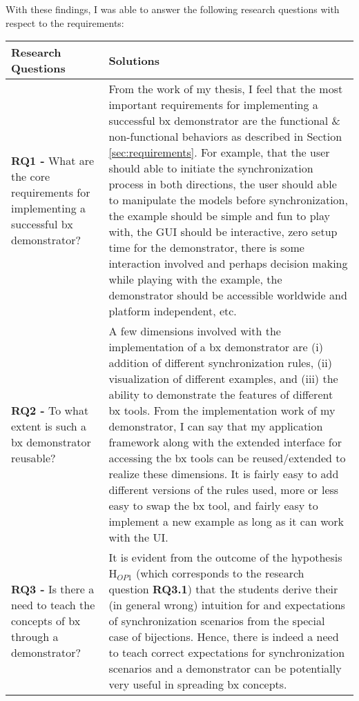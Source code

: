 With these findings, I was able to answer the following research questions with respect to the requirements:
\begin{table}[h]
	\begin{tabular}{|p{5cm}|p{9.5cm}|}
		\hline
		\rowcolor[gray]{.8}	
		\textbf{Research Questions} & \textbf{Solutions}\\
		\hline
		\textbf{RQ1 -} What are the core requirements for implementing a successful bx demonstrator? &
		From the work of my thesis, I feel that the most important requirements for implementing a successful bx demonstrator are the functional \& non-functional behaviors as described in Section \ref{sec:requirements}. For example, that the user should able to initiate the synchronization process in both directions, the user should able to manipulate the models before synchronization, the example should be simple and fun to play with, the GUI should be interactive, zero setup time for the demonstrator, there is some interaction involved and perhaps decision making while playing with the example, the demonstrator should be accessible worldwide and platform independent, etc. \\
		\hline
		\textbf{RQ2 -} To what extent is such a bx demonstrator reusable? &
		A few dimensions involved with the implementation of a bx demonstrator are (i) addition of different synchronization rules, (ii) visualization of different examples, and (iii) the ability to demonstrate the features of different bx tools. From the implementation work of my demonstrator, I can say that my application framework along with the extended interface for accessing the bx tools can be reused/extended to realize these dimensions. It is fairly easy to add different versions of the rules used, more or less easy to swap the bx tool, and fairly easy to implement a new example as long as it can work with the UI.\\
		\hline
		\textbf{RQ3 -} Is there a need to teach the concepts of bx through a demonstrator? &
		It is evident from the outcome of the hypothesis H$_{OP1}$ (which corresponds to the research question \textbf{RQ3.1}) that the students derive their (in general wrong) intuition for and expectations of synchronization scenarios from the special case of bijections. Hence, there is indeed a need to teach correct expectations for synchronization scenarios and a demonstrator can be potentially very useful in spreading bx concepts.\\
		\hline				
	\end{tabular}
	\label{tab:Solutions_ResearchQuestions}
\end{table}

